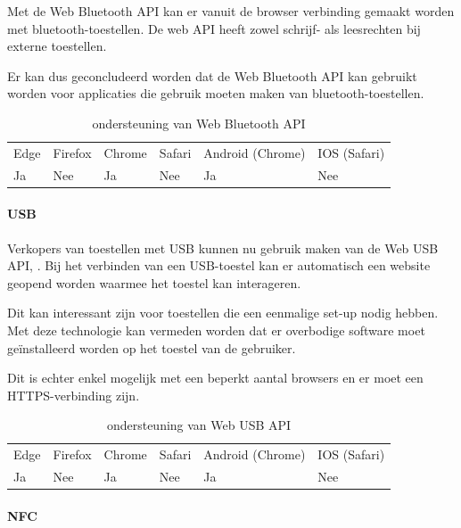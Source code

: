Met de Web Bluetooth API \autocite{Grant2020} kan er vanuit de browser verbinding gemaakt worden met bluetooth-toestellen. De web API heeft zowel schrijf- als leesrechten bij externe toestellen. 

Er kan dus geconcludeerd worden dat de Web Bluetooth API kan gebruikt worden voor applicaties die gebruik moeten maken van bluetooth-toestellen.

\autocite{Beaufort2019a}

\begin{table}[H]
	\centering
	\begin{tabular}{llllll}
		Edge & Firefox & Chrome & Safari & Android (Chrome) & IOS (Safari) \\
		Ja   & Nee      & Ja     & Nee     & Ja               & Nee          
	\end{tabular}	
	\caption{ondersteuning van Web Bluetooth API}
\end{table}



\paragraph{USB}

Verkopers van toestellen met USB kunnen nu gebruik maken van de Web USB API, \autocite{Rockot2020}. Bij het verbinden van een USB-toestel kan er automatisch een website geopend worden waarmee het toestel kan interageren.
 
Dit kan interessant zijn voor toestellen die een eenmalige set-up nodig hebben. Met deze technologie kan vermeden worden dat er overbodige software moet geïnstalleerd worden op het toestel van de gebruiker. 

Dit is echter enkel mogelijk met een beperkt aantal browsers en er moet een HTTPS-verbinding zijn.

\autocite{Beaufort2019b}

\begin{table}[H]
	\centering
	\begin{tabular}{llllll}
		Edge & Firefox & Chrome & Safari & Android (Chrome) & IOS (Safari) \\
		Ja   & Nee      & Ja     & Nee     & Ja               & Nee          
	\end{tabular}	
	\caption{ondersteuning van Web USB API}
\end{table}


\paragraph{NFC}

